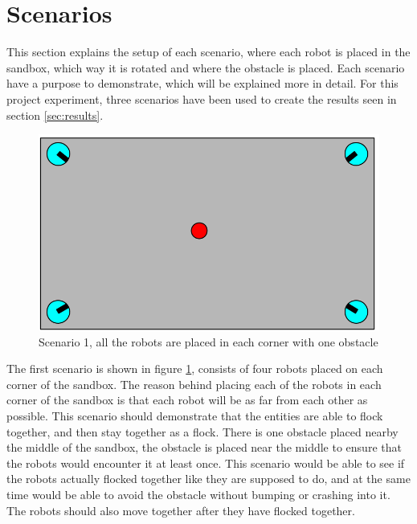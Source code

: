 \section{Scenarios}
This section explains the setup of each scenario, where each robot is placed in the sandbox, which way it is rotated and where the obstacle is placed. Each scenario have a purpose to demonstrate, which will be explained more in detail.
For this project experiment, three scenarios have been used to create the results seen in section \ref{sec:results}.
\label{sec:scenario}
\begin{figure}[h]
\begin{center}
\includegraphics[width=0.8\linewidth]{figs/scenario0}
\end{center}
\caption[scenario 1]{Scenario 1, all the robots are placed in each corner with one obstacle}
\label{fig:scenario1}
\end{figure}

The first scenario is shown in figure \ref{fig:scenario1}, consists of four robots placed on each corner of the sandbox. The reason behind placing each of the robots in each corner of the sandbox is that each robot will be as far from each other as possible. This scenario should demonstrate that the entities are able to flock together, and then stay together as a flock. There is one obstacle placed nearby the middle of the sandbox, the obstacle is placed near the middle to ensure that the robots would encounter it at least once. This scenario would be able to see if the robots actually flocked together like they are supposed to do, and at the same time would be able to avoid the obstacle without bumping or crashing into it. The robots should also move together after they have flocked together.

